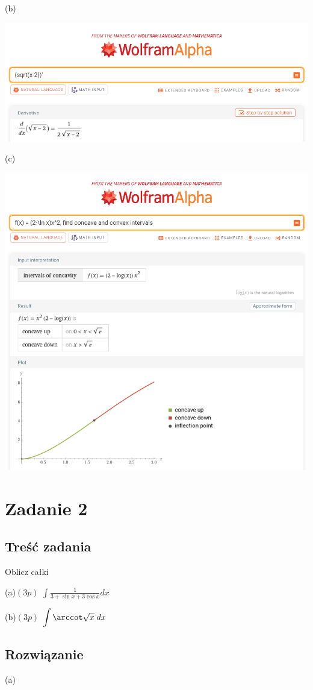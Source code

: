 \documentclass[12pt]{article}
\begin{document}
(b)

\includegraphics[scale=0.35]{am_1_b.png}

(c)

\includegraphics[scale=0.35]{am_1_c.png}

\section{Zadanie 2}
\subsection{Treść zadania}
Oblicz całki

(a)$(3p)$ $\displaystyle \int \frac{1}{3+\sin x+3\cos x} dx$

(b)$(3p)$ $\displaystyle \int \arccot \sqrt{x} \; dx$

\subsection{Rozwiązanie}
(a)
\end{document}
